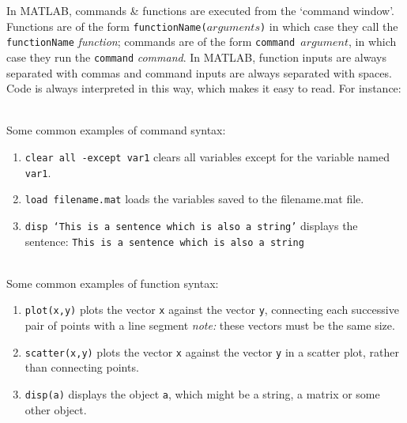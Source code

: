 In MATLAB, commands \& functions are executed from the `command window'. Functions are of the form \texttt{functionName($arguments$)} in which case they call the \texttt{functionName} \emph{function}; commands are of the form \texttt{command $argument$}, in which case they run the \texttt{command} \emph{command}. In MATLAB, function inputs are always separated with commas and command inputs are always separated with spaces. Code is always interpreted in this way, which makes it easy to read. 
For instance:
\begin{example}
\hfill \\
Some common examples of command syntax:
\begin{enumerate}
\item \texttt{clear all -except var1} clears all variables except for the variable named \texttt{var1}.
\item \texttt{load filename.mat} loads the variables saved to the {filename.mat} file.
\item \texttt{disp `This is a sentence which is also a string'} displays the sentence: \texttt{This is a sentence which is also a string}
\end{enumerate}
\end{example}

\begin{example}
\hfill \\
Some common examples of function syntax:
\begin{enumerate}
\item \texttt{plot(x,y)} plots the vector \texttt{x} against the vector \texttt{y}, connecting each successive pair of points with a line segment \emph{note:} these vectors must be the same size.
\item \texttt{scatter(x,y)} plots the vector \texttt{x} against the vector \texttt{y} in a scatter plot, rather than connecting points.
\item \texttt{disp(a)} displays the object \texttt{a}, which might be a string, a matrix or some other object.
\end{enumerate}
\end{example}

